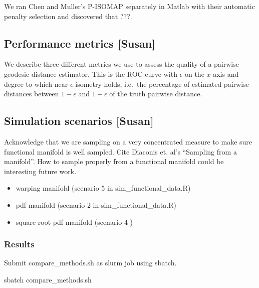 \documentclass[]{article}
\newenvironment{Shaded}{\begin{snugshade}}{\end{snugshade}}
\newcommand{\ExtensionTok}[1]{#1}
\newcommand{\NormalTok}[1]{#1}
\providecommand{\tightlist}{%
  \setlength{\itemsep}{0pt}\setlength{\parskip}{0pt}}
\begin{document}
We ran Chen and Muller's P-ISOMAP separately in Matlab with their
automatic penalty selection and discovered that ???.

\hypertarget{performance-metrics-susan}{%
\subsection{Performance metrics
{[}Susan{]}}\label{performance-metrics-susan}}

We describe three different metrics we use to assess the quality of a
pairwise geodesic distance estimator. This is the ROC curve with
\(\epsilon\) on the \(x\)-axis and degree to which near-\(\epsilon\)
isometry holds, i.e.~the percentage of estimated pairwise distances
between \(1-\epsilon\) and \(1+\epsilon\) of the truth pairwise
distance.

\hypertarget{simulation-scenarios-susan}{%
\subsection{Simulation scenarios
{[}Susan{]}}\label{simulation-scenarios-susan}}

Acknowledge that we are sampling on a very concentrated measure to make
sure functional manifold is well sampled. Cite Diaconis et. al's
``Sampling from a manifold''. How to sample properly from a functional
manifold could be interesting future work.

\begin{itemize}
\tightlist
\item
  warping manifold (scenario 5 in sim\_functional\_data.R)
\item
  pdf manifold (scenario 2 in sim\_functional\_data.R)
\item
  square root pdf manifold (scenario 4 )
\end{itemize}

\hypertarget{results}{%
\subsubsection{Results}\label{results}}

Submit compare\_methods.sh as slurm job using sbatch.

\begin{Shaded}
\begin{Highlighting}[]
\ExtensionTok{sbatch}\NormalTok{ compare_methods.sh}
\end{Highlighting}
\end{Shaded}
\end{document}
